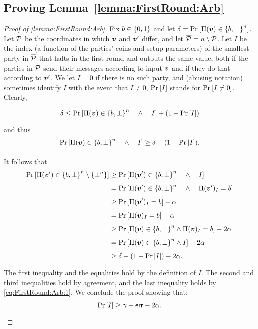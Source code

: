	
\newcommand{\PPf}{\Pi^\cP}	
\subsection{Proving Lemma~\ref{lemma:FirstRound:Arb}}
\begin{proof}[Proof of \cref{lemma:FirstRound:Arb}]
Fix $b \in \{0,1\}$ and let $\delta = \Pr_{}\left[\Pi({ \boldsymbol{v}}) \in \left\{b,\bot\right\}^n\right]$.  Let $\mathcal{P}$ be the coordinates in which ${ \boldsymbol{v}}$ and ${ \boldsymbol{v}}'$ differ, and let ${\overline{\mathcal{P}}} = n \setminus \mathcal{P}$. Let $I$ be the index (a function of the parties' coins and setup parameters) of the smallest party in  ${\overline{\mathcal{P}}}$  that halts in the first round   and outputs the same value, both if the parties in $\mathcal{P}$ send their messages according to input   ${ \boldsymbol{v}}$  and if they do that according to ${ \boldsymbol{v}}'$. We let  $I=0$  if there is no such party, and (abusing notation)  sometimes identify  $I$  with the event that $I\neq 0$, \eg $\Pr_{}\left[I\right]$ stands for $\Pr_{}\left[I\ne 0\right]$.   Clearly,



\begin{align*}
\delta \le  \Pr_{}\left[\Pi({ \boldsymbol{v}}) \in  \left\{b,\bot\right\}^n \quad \land \quad  I\right]+ (1- \Pr_{}\left[I\right])
\end{align*}
and thus
\begin{align}\label{eq:FirstRound:Arb:1}
\Pr_{}\left[\Pi({ \boldsymbol{v}}) \in  \left\{b,\bot\right\}^n \quad \land \quad   I\right] \ge \delta - (1-\Pr_{}\left[I\right]).
\end{align}

	
 It follows that
\begin{align}\label{eq:FirstRound:Arb:2}
\Pr_{}\left[\Pi({ \boldsymbol{v}}')  \in \left\{b,\bot\right\}^n \setminus \left\{\bot^n\right\}\right] &\ge  \Pr_{}\left[\Pi({ \boldsymbol{v}}') \in  \left\{b,\bot\right\}^n \quad \land \quad   I\right]\\
&=\Pr_{}\left[\Pi({ \boldsymbol{v}}') \in  \left\{b,\bot\right\}^n \quad \land \quad   \Pi({ \boldsymbol{v}}')_I= b\right]\nonumber\\
&\ge \Pr_{}\left[\Pi({ \boldsymbol{v}}')_I= b\right] -  \alpha\nonumber\\
&= \Pr_{}\left[\Pi({ \boldsymbol{v}})_I  =  b\right] -  \alpha\nonumber\\
&\ge \Pr_{}\left[\Pi({ \boldsymbol{v}}) \in  \left\{b,\bot\right\}^n \land   \Pi({ \boldsymbol{v}})_I  =  b\right] - 2\alpha\nonumber\\
&= \Pr_{}\left[\Pi({ \boldsymbol{v}}) \in  \left\{b,\bot\right\}^n \land   I\right] - 2\alpha\nonumber\\
&\ge \delta - (1-\Pr_{}\left[I\right]) - 2\alpha.\nonumber
\end{align}
The  first inequality and the equalities hold by the definition of $I$.  The second  and third  inequalities  hold by agreement, and  the last inequality holds by  \cref{eq:FirstRound:Arb:1}. We conclude the proof showing that:
\begin{align}\label{claim:FirstRound:Arb}
	\Pr_{}\left[I\right] \ge \gamma - \mathsf{err}  - 2\alpha.
\end{align}


\end{proof}
